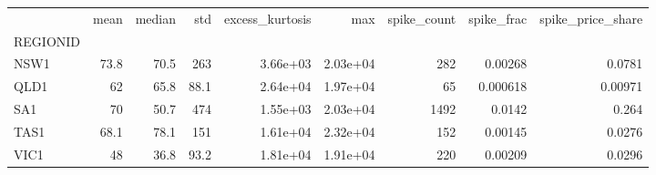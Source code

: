 \begin{tabular}{lrrrrrrrr}
\toprule
 & mean & median & std & excess\_kurtosis & max & spike\_count & spike\_frac & spike\_price\_share \\
REGIONID &  &  &  &  &  &  &  &  \\
\midrule
NSW1 & 73.8 & 70.5 & 263 & 3.66e+03 & 2.03e+04 & 282 & 0.00268 & 0.0781 \\
QLD1 & 62 & 65.8 & 88.1 & 2.64e+04 & 1.97e+04 & 65 & 0.000618 & 0.00971 \\
SA1 & 70 & 50.7 & 474 & 1.55e+03 & 2.03e+04 & 1492 & 0.0142 & 0.264 \\
TAS1 & 68.1 & 78.1 & 151 & 1.61e+04 & 2.32e+04 & 152 & 0.00145 & 0.0276 \\
VIC1 & 48 & 36.8 & 93.2 & 1.81e+04 & 1.91e+04 & 220 & 0.00209 & 0.0296 \\
\bottomrule
\end{tabular}

